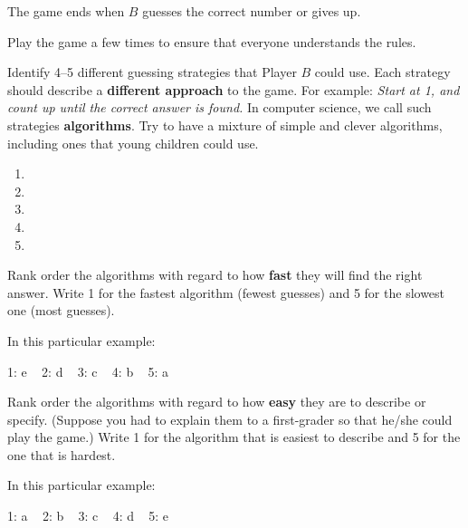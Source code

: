 \begin{answer}[2em]
The game ends when $B$ guesses the correct number or gives up.
\end{answer}


\Q Play the game a few times to ensure that everyone understands the rules.

\vspace{1ex}


\Q Identify 4--5 different guessing strategies that Player $B$ could use.
Each strategy should describe a \textbf{different approach} to the game.
For example: \textit{Start at 1, and count up until the correct answer is found.}
In computer science, we call such strategies \textbf{algorithms}.
Try to have a mixture of simple and clever algorithms, including ones that young children could use.

\begin{enumerate}
\item {}
\item {}
\item {}
\item {}
\item {}
\end{enumerate}


\Q Rank order the algorithms with regard to how \textbf{fast} they will find the right answer.
Write 1 for the fastest algorithm (fewest guesses) and 5 for the slowest one (most guesses).

\begin{answer}
In this particular example:

1: e ~ 2: d ~ 3: c ~ 4: b ~ 5: a
\end{answer}


\Q Rank order the algorithms with regard to how \textbf{easy} they are to describe or specify.
(Suppose you had to explain them to a first-grader so that he/she could play the game.)
Write 1 for the algorithm that is easiest to describe and 5 for the one that is hardest.

\begin{answer}
In this particular example:

1: a ~ 2: b ~ 3: c ~ 4: d ~ 5: e
\end{answer}


